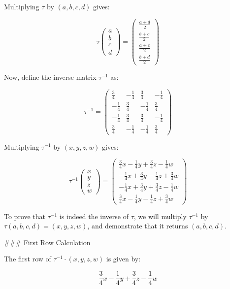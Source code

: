 \documentclass[11pt]{amsart}
\theoremstyle{definition}
\begin{document}
Multiplying $\tau$ by $(a, b, c, d)$ gives:

\[
\tau \begin{pmatrix} a \\ b \\ c \\ d \end{pmatrix} = \begin{pmatrix}
\frac{a + d}{2} \\
\frac{b + c}{2} \\
\frac{a + c}{2} \\
\frac{b + d}{2}
\end{pmatrix}
\]

Now, define the inverse matrix $\tau^{-1}$ as:

\[
\tau^{-1} = \begin{pmatrix}
\frac{3}{4} & -\frac{1}{4} & \frac{3}{4} & -\frac{1}{4} \\
-\frac{1}{4} & \frac{3}{4} & -\frac{1}{4} & \frac{3}{4} \\
-\frac{1}{4} & \frac{3}{4} & \frac{3}{4} & -\frac{1}{4} \\
\frac{3}{4} & -\frac{1}{4} & -\frac{1}{4} & \frac{3}{4}
\end{pmatrix}
\]

Multiplying $\tau^{-1}$ by $(x, y, z, w)$ gives:

\[
\tau^{-1} \begin{pmatrix} x \\ y \\ z \\ w \end{pmatrix} = \begin{pmatrix}
\frac{3}{4}x - \frac{1}{4}y + \frac{3}{4}z - \frac{1}{4}w \\
-\frac{1}{4}x + \frac{3}{4}y - \frac{1}{4}z + \frac{3}{4}w \\
-\frac{1}{4}x + \frac{3}{4}y + \frac{3}{4}z - \frac{1}{4}w \\
\frac{3}{4}x - \frac{1}{4}y - \frac{1}{4}z + \frac{3}{4}w
\end{pmatrix}
\]


To prove that $\tau^{-1}$ is indeed the inverse of $\tau$, we will multiply $\tau^{-1}$ by $\tau(a, b, c, d) = (x, y, z, w)$, and demonstrate that it returns $(a, b, c, d)$.

### First Row Calculation

The first row of $\tau^{-1} \cdot (x, y, z, w)$ is given by:

\[
\frac{3}{4}x - \frac{1}{4}y + \frac{3}{4}z - \frac{1}{4}w
\]
\end{document}
